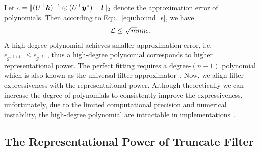 \documentclass{article} %
\def\valpha{{\bm\alpha}}
\def\vlambda{{\bm\lambda}}
\newtheorem{proposition}{\textbf{Proposition}} %
\begin{document}
	Let $\epsilon=\|(U^{\top}{\bm{h}})^{-1}\odot(U^{\top}{\bm{y}}^*)-{\bm{t}}\|_2$ denote the approximation error of polynomials.
	Then according to Equ.~\ref{equ:bound_s}, we have
	\begin{equation}
		\label{equ:bound_poly}
		\begin{aligned}
			{\mathcal{L}}\leq\sqrt{m}n\eta\epsilon.
		\end{aligned}
	\end{equation}
	A high-degree polynomial achieves smaller approximation error, i.e. $\epsilon_{g^{(k+1)}}\leq\epsilon_{g^{(k)}}$, thus a high-degree polynomial corresponds to higher representational power.
	The perfect fitting requires a degree-$(n-1)$ polynomial which is also known as the universal filter approximator~\citep{he2021bernnet,yang2022spectrum,JacobiConv,bo2022specformer}.
	Now, we align filter expressiveness with the representaitonal power.
	Although theoretically we can increase the degree of polynomials to consistently improve the expressiveness, unfortunately, due to the limited computational precision and numerical instability, the high-degree polynomial are intractable in implementations~\citep{yang2022spectrum}.
	
	
	\subsection{The Representational Power of Truncate Filter}
	
\end{document}
